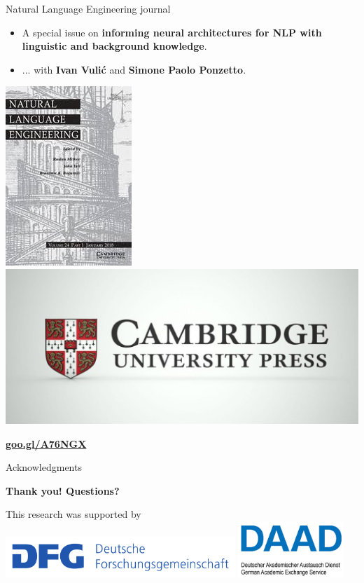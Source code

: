 \begin{frame}{Natural Language Engineering journal}

\vspace{-8pt} 
\begin{itemize}
\item A special issue on \textbf{\alert{informing neural architectures for NLP with linguistic and background knowledge}}.
\item ... with \textbf{Ivan Vuli\'c} and \textbf{Simone Paolo Ponzetto}. 
 \end{itemize}

\begin{center}
	\includegraphics[width=.2\textwidth]{figures/nle-journal}
	\includegraphics[width=.63\textwidth]{figures/cambridge-core}
\end{center}

\textbf{\LARGE \alert{\url{goo.gl/A76NGX}}}
	
	
\end{frame}





\begin{frame}{Acknowledgments}

{\Huge \textbf{Thank you! \alert{Questions?}}}

\vspace{2em}

{\normalsize This research was supported by}
\includegraphics[width=0.65\textwidth]{figures/dfg} \includegraphics[width=0.3\textwidth]{figures/daad}

\end{frame}


